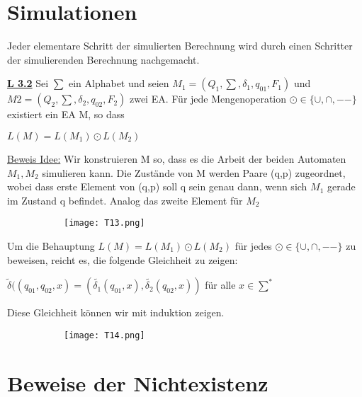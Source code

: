 \documentclass[8pt]{extreport}
\begin{document}
\section{Simulationen}

Jeder elementare Schritt der simulierten Berechnung wird durch einen Schritter der simulierenden Berechnung nachgemacht.

\underline{\textbf{L 3.2}} Sei $\sum$ ein Alphabet und seien $M_1 = (Q_1,\sum,\delta_1,q_{01},F_1)$ und $M2=(Q_2, \sum,\delta_2,q_{02},F_2)$ zwei EA. Für jede Mengenoperation $\odot \in \{\cup,\cap,--\}$ existiert ein EA M, so dass
\begin{center}
$L(M) = L(M_1) \odot L(M_2)$
\end{center}

\underline{Beweis Idee:} Wir konstruieren M so, dass es die Arbeit der beiden Automaten $M_1,M_2$ simulieren kann. Die Zustände von M werden Paare (q,p) zugeordnet, wobei dass erste Element von (q,p) soll q sein genau dann, wenn sich $M_1$ gerade im Zustand q befindet. Analog das zweite Element für $M_2$

\begin{figure}[H]
\centering
\begin{subfigure}[b]{0.49\linewidth}
\texttt{[image: T13.png]}
\end{subfigure}

\end{figure}

Um die Behauptung $L(M) =L(M_1) \odot L(M_2)$ für jedes $\odot \in \{\cup,\cap,--\}$ zu beweisen, reicht es, die folgende Gleichheit zu zeigen:
\begin{center}
$\tilde{\delta}((q_{01},q_{02},x) =(\tilde{\delta_1}(q_{01},x),\tilde{\delta_2}(q_{02},x))$ für alle $x \in \sum^*$
\end{center}
Diese Gleichheit können wir mit induktion zeigen. 
\begin{figure}[H]
\centering
\begin{subfigure}[b]{0.49\linewidth}
\texttt{[image: T14.png]}
\end{subfigure}

\end{figure}


\section{Beweise der Nichtexistenz}
\end{document}
